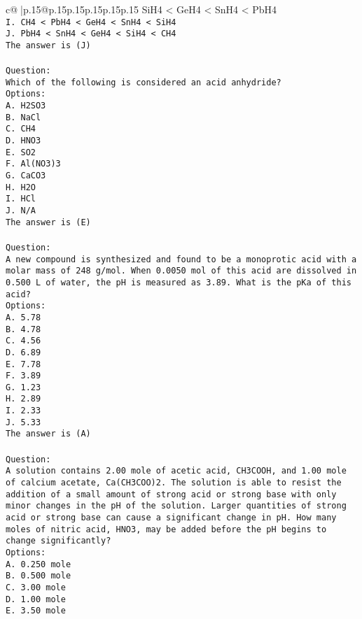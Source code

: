 \documentclass{article}
\begin{document}
{\begin{supertabular}{c@{$\;$}|p{.15\linewidth}@{}p{.15\linewidth}p{.15\linewidth}p{.15\linewidth}p{.15\linewidth}p{.15\linewidth}}
{{{SiH4 < GeH4 < SnH4 < PbH4\\ \tt I. CH4 < PbH4 < GeH4 < SnH4 < SiH4\\ \tt J. PbH4 < SnH4 < GeH4 < SiH4 < CH4\\ \tt The answer is (J)\\ \tt \\ \tt Question:\\ \tt Which of the following is considered an acid anhydride?\\ \tt Options:\\ \tt A. H2SO3\\ \tt B. NaCl\\ \tt C. CH4\\ \tt D. HNO3\\ \tt E. SO2\\ \tt F. Al(NO3)3\\ \tt G. CaCO3\\ \tt H. H2O\\ \tt I. HCl\\ \tt J. N/A\\ \tt The answer is (E)\\ \tt \\ \tt Question:\\ \tt A new compound is synthesized and found to be a monoprotic acid with a molar mass of 248 g/mol. When 0.0050 mol of this acid are dissolved in 0.500 L of water, the pH is measured as 3.89. What is the pKa of this acid?\\ \tt Options:\\ \tt A. 5.78\\ \tt B. 4.78\\ \tt C. 4.56\\ \tt D. 6.89\\ \tt E. 7.78\\ \tt F. 3.89\\ \tt G. 1.23\\ \tt H. 2.89\\ \tt I. 2.33\\ \tt J. 5.33\\ \tt The answer is (A)\\ \tt \\ \tt Question:\\ \tt A solution contains 2.00 mole of acetic acid, CH3COOH, and 1.00 mole of calcium acetate, Ca(CH3COO)2. The solution is able to resist the addition of a small amount of strong acid or strong base with only minor changes in the pH of the solution. Larger quantities of strong acid or strong base can cause a significant change in pH. How many moles of nitric acid, HNO3, may be added before the pH begins to change significantly?\\ \tt Options:\\ \tt A. 0.250 mole\\ \tt B. 0.500 mole\\ \tt C. 3.00 mole\\ \tt D. 1.00 mole\\ \tt E. 3.50 mole\\ }}}
\end{supertabular}}
\end{document}
